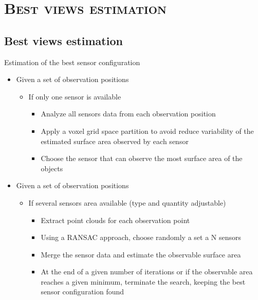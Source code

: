 \section{\scshape Best views estimation}
\subsection*{Best views estimation}
\begin{frame}{Estimation of the best sensor configuration}
	\begin{itemize}
		\item Given a set of observation positions
		\begin{itemize}
			\item If only one sensor is available
			\begin{itemize}
				\item Analyze all sensors data from each observation position
				\item Apply a voxel grid space partition to avoid reduce variability of the estimated surface area observed by each sensor
				\item Choose the sensor that can observe the most surface area of the objects
			\end{itemize}
		\end{itemize}
		\item Given a set of observation positions
		\begin{itemize}
			\item If several sensors area available (type and quantity adjustable)
			\begin{itemize}
				\item Extract point clouds for each observation point
				\item Using a RANSAC approach, choose randomly a set a N sensors
				\item Merge the sensor data and estimate the observable surface area
				\item At the end of a given number of iterations or if the observable area reaches a given minimum, terminate the search, keeping the best sensor configuration found
			\end{itemize}
		\end{itemize}
	\end{itemize}
\end{frame}
